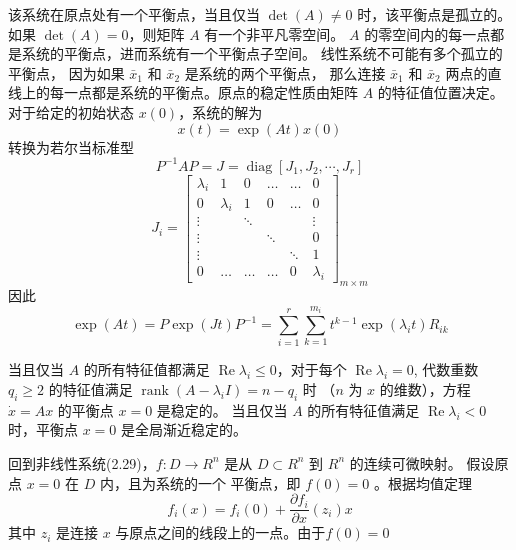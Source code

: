 该系统在原点处有一个平衡点，当且仅当 $\operatorname{det}(A) \neq 0$ 时，该平衡点是孤立的。
如果 $\operatorname{det}(A)=0$，则矩阵 $A$ 有一个非平凡零空间。 $A$ 的零空间内的每一点都是系统的平衡点，进而系统有一个平衡点子空间。
线性系统不可能有多个孤立的平衡点， 因为如果 $\bar{x}_1$ 和 $\bar{x}_2$ 是系统的两个平衡点， 那么连接 $\bar{x}_1$ 和 $\bar{x}_2$ 
两点的直线上的每一点都是系统的平衡点。原点的稳定性质由矩阵 $A$ 的特征值位置决定。对于给定的初始状态 $x(0)$，系统的解为
\begin{equation}
    x(t)=\exp (A t) x(0)
\end{equation}
转换为若尔当标准型
\begin{equation}
    P^{-1} A P=J=\operatorname{diag}\left[J_1,J_2,\cdots,J_r\right]
\end{equation}
\begin{equation}
    J_i=\left[\begin{array}{cccccc}
    \lambda_i & 1 & 0 & \ldots & \ldots & 0 \\
    0 & \lambda_i & 1 & 0 & \ldots & 0 \\
    \vdots & & \ddots & & & \vdots \\
    \vdots & & & \ddots & & 0 \\
    \vdots & & & & \ddots & 1 \\
    0 & \ldots & \ldots & \ldots & 0 & \lambda_i
    \end{array}\right]_{m \times m}
\end{equation}
因此
\begin{equation}
    \exp (A t)=P \exp (J t) P^{-1}=\sum_{i=1}^r \sum_{k=1}^{m_i} t^{k-1} \exp \left(\lambda_i t\right) R_{i k}
\end{equation}
\begin{theorem}
    当且仅当 $A$ 的所有特征值都满足 $\operatorname{Re} \lambda_i \leqslant 0$，对于每个 $\operatorname{Re} \lambda_i=0$,
    代数重数 $q_i \geqslant 2$ 的特征值满足 $\operatorname{rank}\left(A-\lambda_i I\right)=n-q_i$ 时
    （$n$ 为 $x$ 的维数），方程 $\dot{x}=A x$ 的平衡点 $x=0$ 是稳定的。 
    当且仅当 $A$ 的所有特征值满足 $\operatorname{Re} \lambda_i<0$ 时，平衡点 $x=0$ 是全局渐近稳定的。
\end{theorem}
回到非线性系统(2.29)，$f: D \rightarrow R^n$ 是从 $D \subset R^n$ 到 $R^n$ 的连续可微映射。
假设原点 $x=0$ 在 $D$ 内，且为系统的一个 平衡点，即 $f(0)=0$ 。根据均值定理
\begin{equation}
    f_i(x)=f_i(0)+\frac{\partial f_i}{\partial x}\left(z_i\right) x
\end{equation}
其中 $z_i$ 是连接 $x$ 与原点之间的线段上的一点。由于$f(0)=0$
